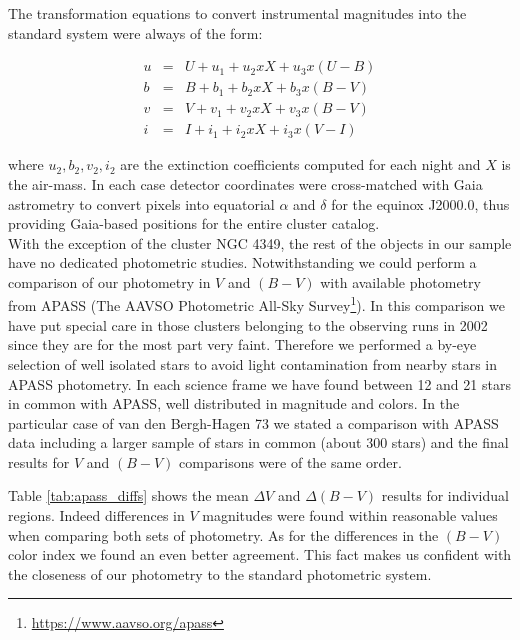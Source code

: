 \documentclass[draft]{aa}
\begin{document}
The transformation equations to convert instrumental magnitudes into the
standard system were always of the form:

\begin{eqnarray*}
    u & = & U+u_1+u_2xX+u_3x(U-B) \\
    b & = & B+b_1+b_2xX+b_3x(B-V) \\
    v & = & V+v_1+v_2xX+v_3x(B-V) \\
    i & = & I+i_1+i_2xX+i_3x(V-I)
\end{eqnarray*}

where $u_2, b_2, v_2, i_2$ are the extinction coefficients computed for each
night and $X$ is the air-mass. In each case detector coordinates were
cross-matched with Gaia astrometry to convert pixels into
equatorial $\alpha$ and $\delta$ for the equinox J2000.0, thus providing
Gaia-based positions for the entire cluster catalog.\\

With the exception of the cluster NGC 4349, the rest of the objects in our
sample have no dedicated photometric studies. Notwithstanding we could perform
a comparison of our photometry in $V$ and $(B-V)$ with available photometry
from APASS (The AAVSO Photometric All-Sky
Survey\footnote{\url{https://www.aavso.org/apass}}).
In this comparison we have put special care in those clusters belonging to the
observing runs in 2002 since they are for the most part very faint. Therefore
we performed a by-eye selection of well isolated stars to avoid light
contamination from nearby stars in APASS photometry. In each science frame we
have found between 12 and 21 stars in common with APASS, well distributed in
magnitude and colors.
In the particular case of van den Bergh-Hagen 73 we stated a comparison with
APASS data including a larger sample of stars in common (about 300 stars) and
the final results for $V$ and $(B-V)$ comparisons were of the same order.

Table \ref{tab:apass_diffs} shows the mean $\Delta V$ and $\Delta(B-V)$ results
for individual regions. Indeed differences in $V$ magnitudes were found within
reasonable values when comparing both sets of photometry. As for the
differences in the $(B-V)$ color index we found an even better agreement. This
fact makes us confident with the closeness of our photometry to the standard
photometric system.\\
\end{document}
